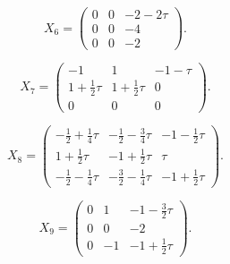 \[X_{6}=\begin{pmatrix}
0 & 0 & -2-2\tau \\
0 & 0 & -4 \\
0 & 0 & -2
\end{pmatrix}.\]

\[X_{7}=\begin{pmatrix}
-1 & 1 & -1-\tau \\
1+\frac{1}{2}\tau & 1+\frac{1}{2}\tau & 0 \\
0 & 0 & 0
\end{pmatrix}.\]

\[X_{8}=\begin{pmatrix}
-\frac{1}{2}+\frac{1}{4}\tau & -\frac{1}{2}-\frac{3}{4}\tau & -1-\frac{1}{2}\tau \\
1+\frac{1}{2}\tau & -1+\frac{1}{2}\tau & \tau \\
-\frac{1}{2}-\frac{1}{4}\tau & -\frac{3}{2}-\frac{1}{4}\tau & -1+\frac{1}{2}\tau
\end{pmatrix}.\]

\[X_{9}=\begin{pmatrix}
0 & 1 & -1-\frac{3}{2}\tau \\
0 & 0 & -2 \\
0 & -1 & -1+\frac{1}{2}\tau
\end{pmatrix}.\]

